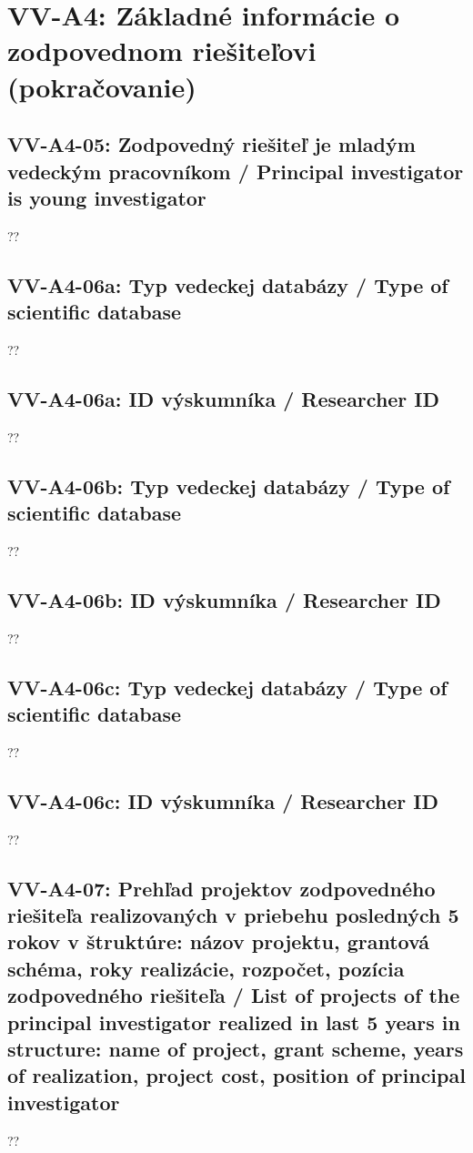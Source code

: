 \section*{VV-A4: Základné informácie o zodpovednom riešiteľovi (pokračovanie)}
\subsection*{VV-A4-05: Zodpovedný riešiteľ je mladým vedeckým pracovníkom / Principal investigator is young investigator }
??\\
\subsection*{VV-A4-06a: Typ vedeckej databázy / Type of scientific database}
??\\
\subsection*{VV-A4-06a: ID výskumníka / Researcher ID}
??\\
\subsection*{VV-A4-06b: Typ vedeckej databázy / Type of scientific database}
??\\
\subsection*{VV-A4-06b:  ID výskumníka / Researcher ID}
??\\
\subsection*{VV-A4-06c: Typ vedeckej databázy / Type of scientific database}
??\\
\subsection*{VV-A4-06c:  ID výskumníka / Researcher ID}
??\\
\subsection*{VV-A4-07: Prehľad projektov zodpovedného riešiteľa realizovaných v priebehu posledných 5 rokov v štruktúre: názov projektu, grantová schéma, roky realizácie, rozpočet, pozícia zodpovedného riešiteľa / List of projects of the principal investigator realized in last 5 years in structure: name of project, grant scheme, years of realization, project cost, position of principal investigator}
??\\
